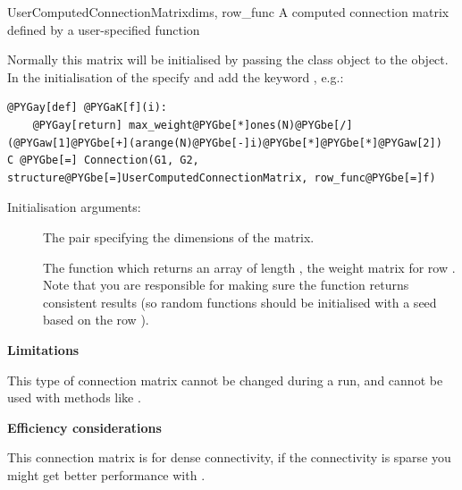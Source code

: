 \documentclass[letterpaper,10pt]{manual}
\begin{document}
\hypertarget{brian.UserComputedConnectionMatrix}{}\begin{classdesc}{UserComputedConnectionMatrix}{dims, row\_func}
A computed connection matrix defined by a user-specified function

Normally this matrix will be initialised by passing the class
object to the \hyperlink{brian.Connection}{} object. In the initialisation
of the \hyperlink{brian.Connection}{} specify 
and add the keyword , e.g.:

\begin{Verbatim}[commandchars=@\[\]]
@PYGay[def] @PYGaK[f](i):
    @PYGay[return] max_weight@PYGbe[*]ones(N)@PYGbe[/](@PYGaw[1]@PYGbe[+](arange(N)@PYGbe[-]i)@PYGbe[*]@PYGbe[*]@PYGaw[2])
C @PYGbe[=] Connection(G1, G2, structure@PYGbe[=]UserComputedConnectionMatrix, row_func@PYGbe[=]f)
\end{Verbatim}

Initialisation arguments:
\begin{description}
\item[]
The pair  specifying the dimensions of the matrix.

\item[]
The function  which returns an array of length ,
the weight matrix for row . Note that you are responsible
for making sure the function returns consistent results (so
random functions should be initialised with a seed based on
the row ).

\end{description}

\textbf{Limitations}

This type of connection matrix cannot be changed during a run, and
cannot be used with methods like .

\textbf{Efficiency considerations}

This connection matrix is for dense connectivity, if the connectivity
is sparse you might get better performance with \hyperlink{brian.UserComputedSparseConnectionMatrix}{}.
\end{classdesc}
\end{document}
